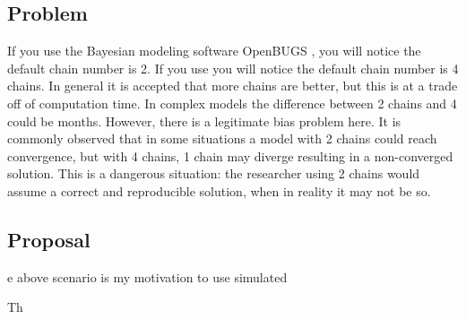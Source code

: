 \documentclass[apa6]{article}
\begin{document}
\subsection{Problem}

If you use the Bayesian modeling software OpenBUGS \cite{spiegelhalter2007openbugs}, you will notice the default chain number is 2. If you use \cite{Rstan} you will notice the default chain number is 4 chains. In general it is accepted that more chains are better, but this is at a trade off of computation time. In complex models the difference between 2 chains and 4 could be months. However, there is a legitimate bias problem here. It is commonly observed that in some situations a model with 2 chains could reach convergence, but with 4 chains, 1 chain may diverge resulting in a non-converged solution. This is a dangerous situation: the researcher using 2 chains would assume a correct and reproducible solution, when in reality it may not be so.


\subsection{Proposal}e above scenario is my motivation to use simulated

Th


{}

\end{document}
